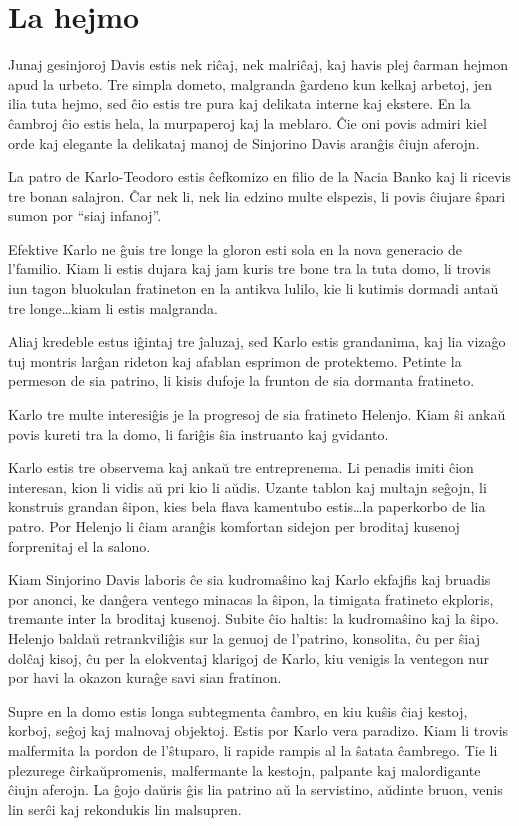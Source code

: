 \chapter{La hejmo}

Junaj gesinjoroj Davis estis nek riĉaj, nek malriĉaj, kaj havis plej ĉarman hejmon apud la urbeto. Tre simpla dometo, malgranda ĝardeno kun kelkaj arbetoj, jen ilia tuta hejmo, sed ĉio estis tre pura kaj delikata interne kaj ekstere. En la ĉambroj ĉio estis hela, la murpaperoj kaj la meblaro. Ĉie oni povis admiri kiel orde kaj elegante la delikataj manoj de Sinjorino Davis aranĝis ĉiujn aferojn.

La patro de Karlo-Teodoro estis ĉefkomizo en filio de la Nacia Banko kaj li ricevis tre bonan salajron. Ĉar nek li, nek lia edzino multe elspezis, li povis ĉiujare ŝpari sumon por ``siaj infanoj''.

Efektive Karlo ne ĝuis tre longe la gloron esti sola en la nova generacio de l'familio. Kiam li estis dujara kaj jam kuris tre bone tra la tuta domo, li trovis iun tagon bluokulan fratineton en la antikva lulilo, kie li kutimis dormadi antaŭ tre longe\ldots{}kiam li estis malgranda.

Aliaj kredeble estus iĝintaj tre ĵaluzaj, sed Karlo estis grandanima, kaj lia vizaĝo tuj montris larĝan rideton kaj afablan esprimon de protektemo. Petinte la permeson de sia patrino, li kisis dufoje la frunton de sia dormanta fratineto.

Karlo tre multe interesiĝis je la progresoj de sia fratineto Helenjo. Kiam ŝi ankaŭ povis kureti tra la domo, li fariĝis ŝia instruanto kaj gvidanto.

Karlo estis tre observema kaj ankaŭ tre entreprenema. Li penadis imiti ĉion interesan, kion li vidis aŭ pri kio li aŭdis. Uzante tablon kaj multajn seĝojn, li konstruis grandan ŝipon, kies bela flava kamentubo estis\ldots{}la paperkorbo de lia patro. Por Helenjo li ĉiam aranĝis komfortan sidejon per broditaj kusenoj forprenitaj el la salono.

Kiam Sinjorino Davis laboris ĉe sia kudromaŝino kaj Karlo ekfajfis kaj bruadis por anonci, ke danĝera ventego minacas la ŝipon, la timigata fratineto ekploris, tremante inter la broditaj kusenoj. Subite ĉio haltis: la kudromaŝino kaj la ŝipo. Helenjo baldaŭ retrankviliĝis sur la genuoj de l'patrino, konsolita, ĉu per ŝiaj dolĉaj kisoj, ĉu per la elokventaj klarigoj de Karlo, kiu venigis la ventegon nur por havi la okazon kuraĝe savi sian fratinon.

Supre en la domo estis longa subtegmenta ĉambro, en kiu kuŝis ĉiaj kestoj, korboj, seĝoj kaj malnovaj objektoj. Estis por Karlo vera paradizo. Kiam li trovis malfermita la pordon de l'ŝtuparo, li rapide rampis al la ŝatata ĉambrego. Tie li plezurege ĉirkaŭpromenis, malfermante la kestojn, palpante kaj malordigante ĉiujn aferojn. La ĝojo daŭris ĝis lia patrino aŭ la servistino, aŭdinte bruon, venis lin serĉi kaj rekondukis lin malsupren.


